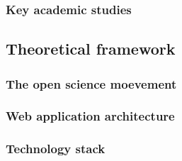 \subsubsection{Key academic studies}

\subsection{Theoretical framework}

\subsubsection{The open science moevement}

\subsubsection{Web application architecture}

\subsubsection{Technology stack}
